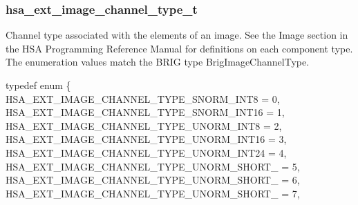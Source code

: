 \documentclass[final,oneside]{book}
\newcommand{\reftyp}[1]{#1}
\newcommand{\refenu}[1]{\reftyp{#1}}
\newenvironment{mylongtable}{\rowcolors{0}{lightgray}{lightgray}\longtable} {
\endlongtable}
\begin{document}
\subsubsection{hsa_\-ext_\-image_\-channel_\-type_\-t}
\vspace{-2.5mm}Channel type associated with the elements of an image. See the Image section in the HSA Programming Reference Manual for definitions on each component type. The enumeration values match the BRIG type BrigImageChannelType.\begin{mylongtable}{@{}p{\textwidth}}
\rule{0pt}{3ex}typedef enum \{\\\hspace{1.7em}\hypertarget{group__ext-images_1ggaa143aa6feeaf24103b886c571ace568fa59d72c5a5199e360e7a5773987696e42}{\refenu{HSA_\-EXT_\-IMAGE_\-CHANNEL_\-TYPE_\-SNORM_\-INT8}} = 0,\\
\hspace{1.7em}\hypertarget{group__ext-images_1ggaa143aa6feeaf24103b886c571ace568fa55ee5e3b2e6f3b593a9cf99f1f195b91}{\refenu{HSA_\-EXT_\-IMAGE_\-CHANNEL_\-TYPE_\-SNORM_\-INT16}} = 1,\\
\hspace{1.7em}\hypertarget{group__ext-images_1ggaa143aa6feeaf24103b886c571ace568fae3100c7304a6e1805711cd6965919e53}{\refenu{HSA_\-EXT_\-IMAGE_\-CHANNEL_\-TYPE_\-UNORM_\-INT8}} = 2,\\
\hspace{1.7em}\hypertarget{group__ext-images_1ggaa143aa6feeaf24103b886c571ace568fa9a27c2852fb86761dcbabfda391a8e73}{\refenu{HSA_\-EXT_\-IMAGE_\-CHANNEL_\-TYPE_\-UNORM_\-INT16}} = 3,\\
\hspace{1.7em}\hypertarget{group__ext-images_1ggaa143aa6feeaf24103b886c571ace568fa0b12c9e8bee88608297ecd9246ebf96a}{\refenu{HSA_\-EXT_\-IMAGE_\-CHANNEL_\-TYPE_\-UNORM_\-INT24}} = 4,\\
\hspace{1.7em}\hypertarget{group__ext-images_1ggaa143aa6feeaf24103b886c571ace568fa40e1eb056776d35da9f1dbaf2e264a19}{\refenu{HSA_\-EXT_\-IMAGE_\-CHANNEL_\-TYPE_\-UNORM_\-SHORT_}} = 5,\\
\hspace{1.7em}\hypertarget{group__ext-images_1ggaa143aa6feeaf24103b886c571ace568fa6165cebe82d6c2b115bbce04548f5626}{\refenu{HSA_\-EXT_\-IMAGE_\-CHANNEL_\-TYPE_\-UNORM_\-SHORT_}} = 6,\\
\hspace{1.7em}\hypertarget{group__ext-images_1ggaa143aa6feeaf24103b886c571ace568fad5193853cc5321dd50b16eb9e920237f}{\refenu{HSA_\-EXT_\-IMAGE_\-CHANNEL_\-TYPE_\-UNORM_\-SHORT_}} = 7,\\

\end{mylongtable}
\end{document}
